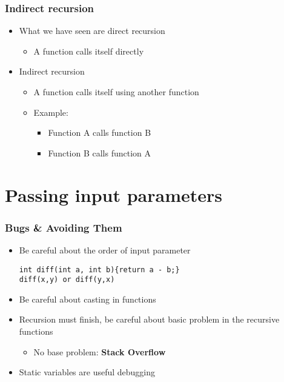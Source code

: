 \documentclass{../c-lecture}
\begin{document}
\begin{frame}
  \frametitle{Indirect recursion}
  \begin{itemize}
    \item What we have seen are direct recursion
    \begin{itemize}
      \item A function calls itself directly
    \end{itemize}
    \item Indirect recursion
    \begin{itemize}
      \item A function calls itself using another function
      \item Example:
      \begin{itemize}
        \item Function A calls function B
        \item Function B calls function A
      \end{itemize}
    \end{itemize}
  \end{itemize}
\end{frame}

\section{Passing input parameters}

\begin{frame}[fragile]
  \frametitle{Bugs \& Avoiding Them}
  \begin{itemize}
    \item Be careful about the order of input parameter
    \begin{verbatim}
int diff(int a, int b){return a - b;}
diff(x,y) or diff(y,x)
    \end{verbatim}
    \item Be careful about casting in functions
    \item
      Recursion must finish, be careful about basic problem in the recursive
      functions
    \begin{itemize}
      \item
        No base problem: \textbf{\color{YellowOrange} Stack Overflow}
    \end{itemize}
    \item Static variables are useful debugging
  \end{itemize}
\end{frame}
\end{document}
